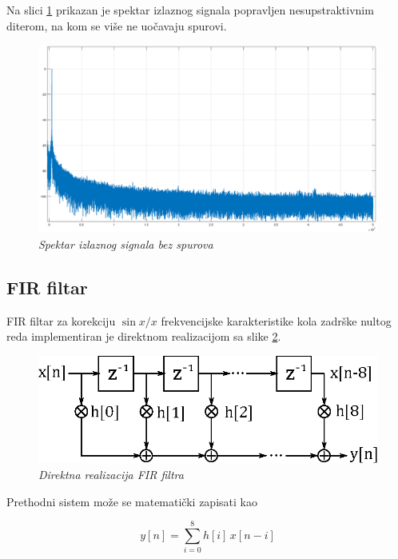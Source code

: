 \documentclass[conference]{IEEEtran}
\begin{document}
Na slici \ref{slika:nospur} prikazan je spektar izlaznog signala popravljen nesupstraktivnim diterom, na kom se više ne uočavaju spurovi.

\begin{figure}[h]
	\centering
	\includegraphics[scale=0.15]{./slike/nospur.eps}
	\caption{\textsl{Spektar izlaznog signala bez spurova}}
	\label{slika:nospur}
\end{figure}

\subsection{FIR filtar}
FIR filtar za korekciju $\sin x/x$ frekvencijske karakteristike kola zadrške nultog reda implementiran je direktnom realizacijom sa slike \ref{slika:FIRreal}.

\begin{figure}[h]
	\centering
	\includegraphics[scale=0.7]{./slike/FIRreal.eps}
	\caption{\textsl{Direktna realizacija FIR filtra}}
	\label{slika:FIRreal}
\end{figure}

Prethodni sistem može se matematički zapisati kao

\begin{equation}\label{eq:konv}
y[n] = \sum_{i=0}^{8}{h[i]\,x[n-i]}
\end{equation}
\end{document}
